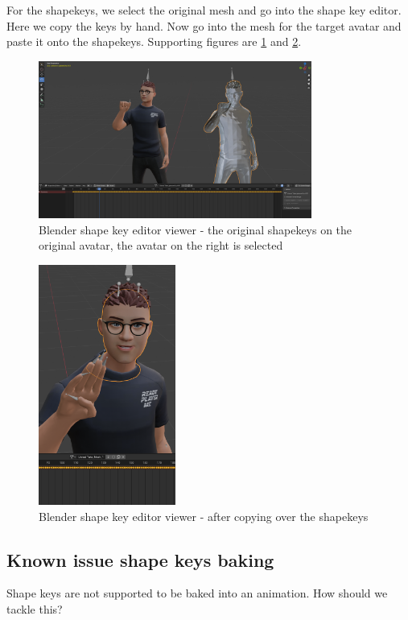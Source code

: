 \documentclass{uva-inf-article}
\begin{document}
For the shapekeys, we select the original mesh and go into the shape key editor. Here we copy the keys by hand. Now go into the mesh for the target avatar and paste it onto the shapekeys. Supporting figures are \ref{fig:blend1} and \ref{fig:blend2}.
\begin{figure}[hbt!]
    \centering
    \includegraphics[width=0.8\textwidth]{imgs/copyingAnims/Blend1.png}
    \caption{Blender shape key editor viewer - the original shapekeys on the original avatar, the avatar on the right is selected }
    \label{fig:blend1}
\end{figure}
\begin{figure}[hbt!]
    \centering
    \includegraphics[width=0.4\textwidth]{imgs/copyingAnims/Blend2.png}
    \caption{Blender shape key editor viewer - after copying over the shapekeys }
    \label{fig:blend2}
\end{figure}

\subsection{Known issue shape keys baking}
Shape keys are not supported to be baked into an animation. How should we tackle this?
\end{document}
